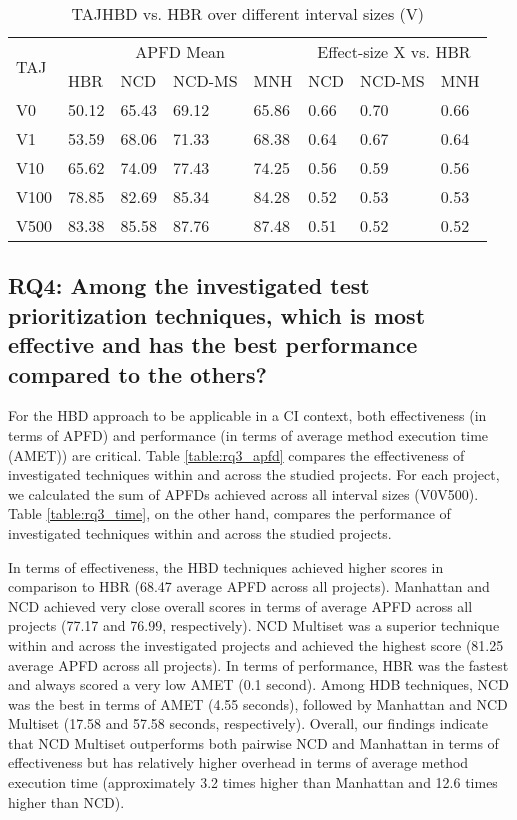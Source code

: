 \documentclass[1p]{elsarticle}
\begin{document}
\begin{table} [H]
\centering
\caption {TAJ\textendash HBD vs. HBR over different interval sizes (V)}
\label{table:rq3_p6}
  \begin{tabular}{|l|l|l|l|l|l|l|l|}
    \hline
    \multirow{2}{*}{TAJ} &
      \multicolumn{4}{c|}{APFD Mean} &
      \multicolumn{3}{c|}{Effect-size X vs. HBR} \\
    & HBR & NCD & NCD-MS & MNH & NCD & NCD-MS & MNH \\
    \hline
    \hline
	V0&50.12&65.43&69.12&65.86&0.66\cellcolor{Gray}&0.70\cellcolor{Gray}&0.66\cellcolor{Gray}\\
	\hline
	V1&53.59&68.06&71.33&68.38&0.64\cellcolor{Gray}&0.67\cellcolor{Gray}&0.64\cellcolor{Gray}\\
	\hline
	V10&65.62&74.09&77.43&74.25&0.56\cellcolor{Gray}&0.59\cellcolor{Gray}&0.56\cellcolor{Gray}\\
	\hline
	V100&78.85&82.69&85.34&84.28&0.52\cellcolor{Gray}&0.53\cellcolor{Gray}&0.53\cellcolor{Gray}\\
	\hline
	V500&83.38&85.58&87.76&87.48&0.51\cellcolor{Gray}&0.52\cellcolor{Gray}&0.52\cellcolor{Gray}\\
	\hline
  \end{tabular}
\end{table}



\subsection{RQ4: Among the investigated test prioritization techniques, which is most effective and has the best performance compared to the others?}

For the HBD approach to be applicable in a CI context, both effectiveness (in terms of APFD) and performance (in terms of average method execution time (AMET)) are critical. Table \ref{table:rq3_apfd} compares the effectiveness of investigated techniques within and across the studied projects. For each project, we calculated the sum of APFDs achieved across all interval sizes (V0\textendash V500). Table \ref{table:rq3_time}, on the other hand, compares the performance of investigated techniques within and across the studied projects.

In terms of effectiveness, the HBD techniques achieved higher scores in comparison to HBR (68.47 average APFD across all projects). Manhattan and NCD achieved very close overall scores in terms of average APFD across all projects (77.17 and 76.99, respectively). NCD Multiset was a superior technique within and across the investigated projects and achieved the highest score (81.25 average APFD across all projects). In terms of performance, HBR was the fastest and always scored a very low AMET (0.1 second). Among HDB techniques, NCD was the best in terms of AMET (4.55 seconds), followed by Manhattan and NCD Multiset (17.58 and 57.58 seconds, respectively). Overall, our findings indicate that NCD Multiset outperforms both pairwise NCD and Manhattan in terms of effectiveness but has relatively higher overhead in terms of average method execution time (approximately 3.2 times higher than Manhattan and 12.6 times higher than NCD).
\end{document}
